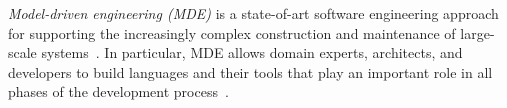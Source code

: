 \begin{comment}
\section*{ Relevance and importance} 
\begin{itemize}
 \item {need of mm and code coevolving , 
what exists in literature??? :
metamodel and models , constraints ,transformations}
 \item {Change detection / propagation ??}
 \item { Describe contribution of this work.}
\end{itemize}

The evolution of metamodel that implies other generated artifacts evolution, as a consequence, a manual updating of depending projects is mendatory to keep them operational. One of the most chanlleging steps now in MDE is to allow Metamodel and generated artifacts co-evolution to make the updating of depending projects  semi-automatic or even automatic.


\section*{  Questions and objectives}
\begin{itemize}
 \item {Design and implementation of the solution :
Giving a scenario, the blocking point , and  how our solution will unblock the situation}
 \item {Ojective : Evaluation of  our solution:
inputs and outputs, evaluation mesures }
 \item { research questions ???}
 \item { Discussion of results briefly }
\end{itemize}
My work is about metamodel and code co-evolution. Given a metamodel that avolves from version to another, generating different code APIs, how can we update depending projects ?
\section*{  Overview of the structure} 

\end{comment}

\emph{Model-driven engineering (MDE)} is a state-of-art software engineering approach for supporting the increasingly complex construction and maintenance of large-scale systems~\cite{kent2002, hutchinson2011empirical,hutchinson2011model}. In particular, MDE allows domain experts, architects, and developers to build languages and their tools that play an important role in all phases of the development process~\cite{tolvanen2009metaedit}.

